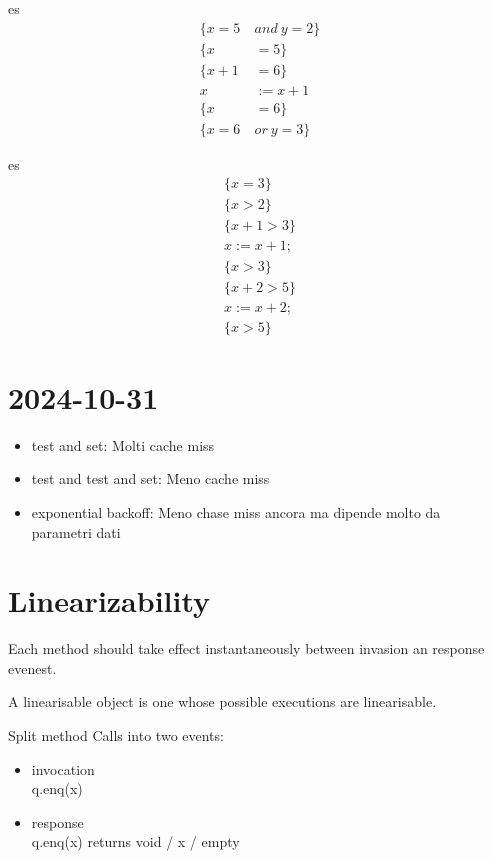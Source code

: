 \documentclass{article}
\begin{document}
\begin{esempio}{es}
    \begin{align*}
        \{x=5\ &and\ y=2\} \\
        \{x&=5\} \\
        \{x+1&=6\} \\
        x&:=x+1 \\
        \{x&=6\} \\
        \{x=6\ &or\ y=3\}
    \end{align*}
\end{esempio}

\begin{esempio}{es}
    \[\begin{array}{c}
        \{x=3\} \\
        \{x>2\} \\
        \{x+1>3\} \\
        x:=x+1; \\
        \{x>3\} \\
        \{x+2>5\} \\
        x:=x+2; \\
        \{x>5\}
    \end{array}\] 
\end{esempio}

\section{2024-10-31}
\begin{itemize}
    \item test and set: Molti cache miss
    \item test and test and set: Meno cache miss
    \item exponential backoff: Meno chase miss ancora ma dipende molto da\\ parametri dati
\end{itemize}

\section{Linearizability}
Each method should take effect instantaneously between invasion an response evenest.

A linearisable object is one whose possible executions are linearisable.

Split method Calls into two events:
\begin{itemize}
    \item invocation \\
        q.enq(x)
    \item response \\
        q.enq(x) returns void / x / empty
\end{itemize}
\end{document}

